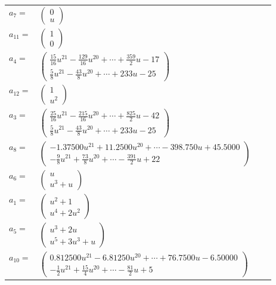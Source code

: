 \documentclass[1p]{elsarticle_modified}
\theoremstyle{definition}
\begin{document}
\begin{tabular}{m{7pt} m{180pt} m{7pt} m{180pt} }
\flushright $a_{7}=$&$\begin{pmatrix}0\\u\end{pmatrix}$ \\
\flushright $a_{11}=$&$\begin{pmatrix}1\\0\end{pmatrix}$ \\
\flushright $a_{4}=$&$\begin{pmatrix}\frac{15}{16} u^{21}-\frac{129}{16} u^{20}+\cdots+\frac{359}{2} u-17\\\frac{5}{8} u^{21}-\frac{43}{8} u^{20}+\cdots+233 u-25\end{pmatrix}$ \\
\flushright $a_{12}=$&$\begin{pmatrix}1\\u^2\end{pmatrix}$ \\
\flushright $a_{3}=$&$\begin{pmatrix}\frac{25}{16} u^{21}-\frac{215}{16} u^{20}+\cdots+\frac{825}{2} u-42\\\frac{5}{8} u^{21}-\frac{43}{8} u^{20}+\cdots+233 u-25\end{pmatrix}$ \\
\flushright $a_{8}=$&$\begin{pmatrix}-1.37500 u^{21}+11.2500 u^{20}+\cdots-398.750 u+45.5000\\-\frac{9}{8} u^{21}+\frac{73}{8} u^{20}+\cdots-\frac{391}{2} u+22\end{pmatrix}$ \\
\flushright $a_{6}=$&$\begin{pmatrix}u\\u^3+u\end{pmatrix}$ \\
\flushright $a_{1}=$&$\begin{pmatrix}u^2+1\\u^4+2 u^2\end{pmatrix}$ \\
\flushright $a_{5}=$&$\begin{pmatrix}u^3+2 u\\u^5+3 u^3+u\end{pmatrix}$ \\
\flushright $a_{10}=$&$\begin{pmatrix}0.812500 u^{21}-6.81250 u^{20}+\cdots+76.7500 u-6.50000\\-\frac{1}{2} u^{21}+\frac{15}{4} u^{20}+\cdots-\frac{81}{2} u+5\end{pmatrix}$ \\

\end{tabular}
\end{document}
